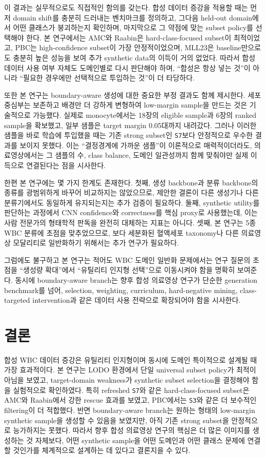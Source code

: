 \documentclass[11pt]{article}
\begin{document}
이 결과는 실무적으로도 직접적인 함의를 갖는다. 합성 데이터 증강을 적용할 때는 먼저 domain shift를 충분히 드러내는 벤치마크를 정의하고, 그다음 held-out domain에서 어떤 클래스가 붕괴하는지 확인하며, 마지막으로 그 약점에 맞는 subset policy를 선택해야 한다. 본 연구에서는 AMC와 Raabin은 hard-class-focused subset이 최적이었고, PBC는 high-confidence subset이 가장 안정적이었으며, MLL23은 baseline만으로도 충분히 높은 성능을 보여 추가 synthetic data의 이득이 거의 없었다. 따라서 합성 데이터 사용 여부 자체도 도메인별로 다시 판단해야 하며, ``합성은 항상 넣는 것''이 아니라 ``필요한 경우에만 선택적으로 투입하는 것''이 더 타당하다.

또한 본 연구는 boundary-aware 생성에 대한 중요한 부정 결과도 함께 제시한다. 세포 중심부는 보존하고 배경만 더 강하게 변형하여 low-margin sample을 만드는 것은 기술적으로 가능했다. 실제로 monocyte에서는 18장의 eligible sample과 6장의 ranked sample을 확보했고, 일부 샘플은 target margin 0.05대까지 내려갔다. 그러나 이러한 샘플을 바로 학습에 투입했을 때는 기존 strong subset인 \texttt{S7}보다 안정적으로 우수한 결과를 보이지 못했다. 이는 ``결정경계에 가까운 샘플''이 이론적으로 매력적이더라도, 의료영상에서는 그 샘플의 수, class balance, 도메인 일관성까지 함께 맞춰야만 실제 이득으로 연결된다는 점을 시사한다.

한편 본 연구에는 몇 가지 한계도 존재한다. 첫째, 생성 backbone과 분류 backbone의 종류를 광범위하게 바꾸어 비교하지는 않았으므로, 제안한 결론이 다른 생성기나 다른 분류기에서도 동일하게 유지되는지는 추가 검증이 필요하다. 둘째, synthetic utility를 판단하는 과정에서 CNN confidence와 correctness를 핵심 proxy로 사용했는데, 이는 사람 전문가의 형태학적 판독을 완전히 대체하는 지표는 아니다. 셋째, 본 연구는 5종 WBC 분류에 초점을 맞추었으므로, 보다 세분화된 혈액세포 taxonomy나 다른 의료영상 모달리티로 일반화하기 위해서는 추가 연구가 필요하다.

그럼에도 불구하고 본 연구는 적어도 WBC 도메인 일반화 문제에서는 연구 질문의 초점을 ``생성량 확대''에서 ``유틸리티 인지형 선택''으로 이동시켜야 함을 명확히 보여준다. 동시에 boundary-aware branch는 향후 합성 의료영상 연구가 단순한 generation benchmark를 넘어, selection, weighting, curriculum, hard-negative mining, class-targeted intervention과 같은 데이터 사용 전략으로 확장되어야 함을 시사한다.

\section{결론}

합성 WBC 데이터 증강은 유틸리티 인지형이며 동시에 도메인 특이적으로 설계될 때 가장 효과적이다. 본 연구는 LODO 환경에서 단일 universal subset policy가 최적이 아님을 보였고, target-domain weakness가 synthetic subset selection을 결정해야 함을 실험적으로 확인하였다. 특히 refreshed \texttt{S7}와 같은 hard-class-focused subset은 AMC와 Raabin에서 강한 rescue 효과를 보였고, PBC에서는 \texttt{S3}와 같은 더 보수적인 filtering이 더 적합했다. 반면 boundary-aware branch는 원하는 형태의 low-margin synthetic sample을 생성할 수 있음을 보였지만, 아직 기존 strong subset을 안정적으로 능가하지는 못했다. 따라서 향후 합성 의료영상 연구의 핵심은 더 많은 이미지를 생성하는 것 자체보다, 어떤 synthetic sample을 어떤 도메인과 어떤 클래스 문제에 연결할 것인가를 체계적으로 설계하는 데 있다고 결론지을 수 있다.
\end{document}

